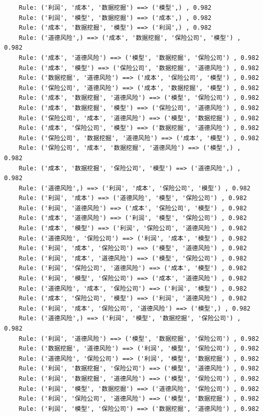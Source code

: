 \documentclass[lang=cn,11pt,a4paper,cite=authoryear]{elegantpaper}
\begin{document}
\begin{lstlisting}
	Rule: ('利润', '成本', '数据挖掘') ==> ('模型',) , 0.982
	Rule: ('利润', '模型', '数据挖掘') ==> ('成本',) , 0.982
	Rule: ('成本', '数据挖掘', '模型') ==> ('利润',) , 0.982
	Rule: ('道德风险',) ==> ('成本', '数据挖掘', '保险公司', '模型') , 0.982
	Rule: ('成本', '道德风险') ==> ('模型', '数据挖掘', '保险公司') , 0.982
	Rule: ('成本', '模型') ==> ('保险公司', '数据挖掘', '道德风险') , 0.982
	Rule: ('数据挖掘', '道德风险') ==> ('成本', '保险公司', '模型') , 0.982
	Rule: ('保险公司', '道德风险') ==> ('成本', '数据挖掘', '模型') , 0.982
	Rule: ('成本', '数据挖掘', '道德风险') ==> ('模型', '保险公司') , 0.982
	Rule: ('成本', '数据挖掘', '模型') ==> ('保险公司', '道德风险') , 0.982
	Rule: ('保险公司', '成本', '道德风险') ==> ('模型', '数据挖掘') , 0.982
	Rule: ('成本', '保险公司', '模型') ==> ('数据挖掘', '道德风险') , 0.982
	Rule: ('保险公司', '数据挖掘', '道德风险') ==> ('成本', '模型') , 0.982
	Rule: ('保险公司', '成本', '数据挖掘', '道德风险') ==> ('模型',) , 0.982
	Rule: ('成本', '数据挖掘', '保险公司', '模型') ==> ('道德风险',) , 0.982
	Rule: ('道德风险',) ==> ('利润', '成本', '保险公司', '模型') , 0.982
	Rule: ('利润', '成本') ==> ('道德风险', '模型', '保险公司') , 0.982
	Rule: ('利润', '道德风险') ==> ('成本', '保险公司', '模型') , 0.982
	Rule: ('成本', '道德风险') ==> ('利润', '模型', '保险公司') , 0.982
	Rule: ('成本', '模型') ==> ('利润', '保险公司', '道德风险') , 0.982
	Rule: ('道德风险', '保险公司') ==> ('利润', '成本', '模型') , 0.982
	Rule: ('利润', '成本', '保险公司') ==> ('模型', '道德风险') , 0.982
	Rule: ('利润', '成本', '道德风险') ==> ('模型', '保险公司') , 0.982
	Rule: ('利润', '保险公司', '道德风险') ==> ('成本', '模型') , 0.982
	Rule: ('利润', '模型', '保险公司') ==> ('成本', '道德风险') , 0.982
	Rule: ('道德风险', '成本', '保险公司') ==> ('利润', '模型') , 0.982
	Rule: ('成本', '保险公司', '模型') ==> ('利润', '道德风险') , 0.982
	Rule: ('利润', '成本', '保险公司', '道德风险') ==> ('模型',) , 0.982
	Rule: ('道德风险',) ==> ('利润', '模型', '数据挖掘', '保险公司') , 0.982
	Rule: ('利润', '道德风险') ==> ('模型', '数据挖掘', '保险公司') , 0.982
	Rule: ('数据挖掘', '道德风险') ==> ('利润', '模型', '保险公司') , 0.982
	Rule: ('道德风险', '保险公司') ==> ('利润', '模型', '数据挖掘') , 0.982
	Rule: ('利润', '数据挖掘', '保险公司') ==> ('模型', '道德风险') , 0.982
	Rule: ('利润', '数据挖掘', '道德风险') ==> ('模型', '保险公司') , 0.982
	Rule: ('利润', '模型', '数据挖掘') ==> ('道德风险', '保险公司') , 0.982
	Rule: ('利润', '保险公司', '道德风险') ==> ('模型', '数据挖掘') , 0.982
	Rule: ('利润', '模型', '保险公司') ==> ('数据挖掘', '道德风险') , 0.982

\end{lstlisting}
\end{document}
